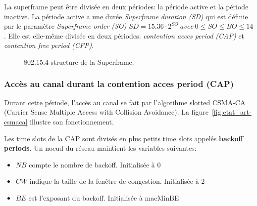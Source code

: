   La superframe peut être divisée en deux périodes: la période active et la période inactive.
  La période active a une durée \textit{Superframe duration (SD)} qui est définie par 
  le paramètre \textit{Superframe order (SO)} $SD=15.36 \cdot 2^{SO}\ avec\ 0 \leq SO \leq BO \leq 14$.
  Elle est elle-même divisée en deux périodes:
  \textit{contention acces period (CAP)} et \textit{contention free period (CFP)}.
  \begin{figure}[H]
    \centering
    \caption{802.15.4 structure de la Superframe.}
    \label{fig:etat_art-802.15.4.superframe}
  \end{figure}

\subsubsection*{Accès au canal durant la contention acces period (CAP)}
  Durant cette période, l'accès au canal se fait par l'algotihme slotted CSMA-CA
  (Carrier Sense Multiple Access with Collision Avoidance). La figure~\ref{fig:etat_art-csmaca}
  illustre son fonctionnement.

  Les time slots de la CAP sont divisés en plus petits time slots appelés \textbf{backoff periods}.
  Un noeud du réseau maintient les variables suivantes:
  \begin{itemize}
    \item $NB$ compte le nombre de backoff. Initialisée à 0
    \item $CW$ indique la taille de la fenêtre de congestion. Initialisée à 2
    \item $BE$ est l'exposant du backoff. Initialisée à macMinBE
  \end{itemize}


